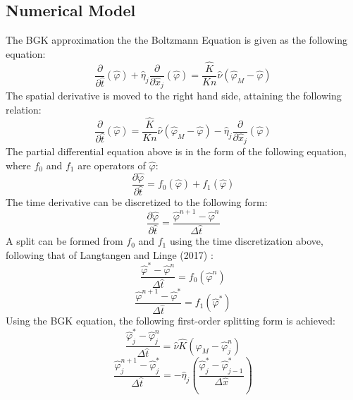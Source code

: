 \documentclass[a4paper]{article}
\begin{document}
\subsection{Numerical Model}
The BGK approximation the the Boltzmann Equation is given as the following equation:
\begin{equation}
    \dfrac{\partial}{\partial \hat{t}}(\hat{\varphi}) + \hat{\eta}_j \dfrac{\partial}{\partial \hat{x}_j} (\hat{\varphi})  = \dfrac{\hat{K}}{Kn}\hat{\nu} (\hat{\varphi}_M - \hat{\varphi})
\end{equation}
The spatial derivative is moved to the right hand side, attaining the following relation:
\begin{equation}
    \dfrac{\partial}{\partial \hat{t}}(\hat{\varphi})   = \dfrac{\hat{K}}{Kn}\hat{\nu} (\hat{\varphi}_M - \hat{\varphi}) - \hat{\eta}_j \dfrac{\partial}{\partial \hat{x}_j} (\hat{\varphi})
\end{equation}
The partial differential equation above is in the form of the following equation, where $f_0$ and $f_1$ are operators of $\hat{\varphi}$:
\begin{equation}
    \dfrac{\partial\hat{\varphi}}{\partial \hat{t}} = f_0(\hat{\varphi}) + f_1(\hat{\varphi})
\end{equation}
The time derivative can be discretized to the following form:
\begin{equation}
   \dfrac{\partial \hat{\varphi}}{\partial \hat{t}} = \dfrac{\hat{\varphi}^{n+1} - \hat{\varphi}^{n}}{\Delta \hat{t}} 
\end{equation}
A split can be formed from $f_0$ and $f_1$ using the time discretization above, following that of Langtangen and Linge (2017) \cite{langtangen2017finite}:
\begin{equation}
    \dfrac{\hat{\varphi}^{*} - \hat{\varphi}^{n}}{\Delta \hat{t}} = f_0(\hat{\varphi}^n)
\end{equation}
\begin{equation}
    \dfrac{\hat{\varphi}^{n+1} - \hat{\varphi}^{*}}{\Delta \hat{t}} = f_1(\hat{\varphi}^*)
\end{equation}
Using the BGK equation, the following first-order splitting form is achieved:
\begin{equation}
    \dfrac{\hat{\varphi}^{*}_j - \hat{\varphi}^{n}_j}{\Delta \hat{t}} =\hat{\nu} \hat{K}(\hat{\varphi}_M - \hat{\varphi}^n_j) 
\end{equation}
\begin{equation}
    \dfrac{\hat{\varphi}^{n+1}_j - \hat{\varphi}^{*}_j}{\Delta \hat{t}} = -\hat{\eta}_j \left(\dfrac{\hat{\varphi}^*_{j} - \hat{\varphi}^*_{j-1}}{\Delta \hat{x}}\right)
\end{equation}
\end{document}
